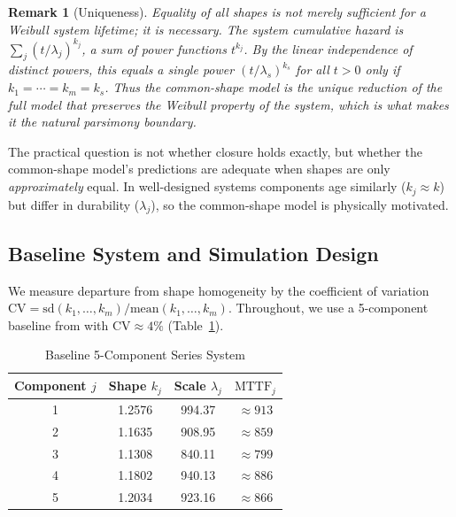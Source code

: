 \documentclass[11pt]{article}
\newcommand{\CV}{\mathrm{CV}}
\newcommand{\MTTF}{\mathrm{MTTF}}
\newtheorem{remark}{Remark}[section]
\begin{document}
\begin{remark}[Uniqueness]
\label{rem:uniqueness}
Equality of all shapes is not merely sufficient for a Weibull system lifetime; it is necessary. The system cumulative hazard is $\sum_j (t/\lambda_j)^{k_j}$, a sum of power functions $t^{k_j}$. By the linear independence of distinct powers, this equals a single power $(t/\lambda_s)^{k_s}$ for all $t>0$ only if $k_1 = \cdots = k_m = k_s$. Thus the common-shape model is the unique reduction of the full model that preserves the Weibull property of the system, which is what makes it the natural parsimony boundary.
\end{remark}

The practical question is not whether closure holds exactly, but whether the common-shape model's predictions are adequate when shapes are only \emph{approximately} equal. In well-designed systems components age similarly ($k_j \approx k$) but differ in durability ($\lambda_j$), so the common-shape model is physically motivated.

\subsection{Baseline System and Simulation Design}
\label{sec:baseline}

We measure departure from shape homogeneity by the coefficient of variation $\CV = \mathrm{sd}(k_1,\ldots,k_m)/\mathrm{mean}(k_1,\ldots,k_m)$. Throughout, we use a 5-component baseline from \citet{Huairu-2013} with $\CV \approx 4\%$ (Table~\ref{tab:series-sys}).

\begin{table}[htbp]
\centering
\caption{Baseline 5-Component Series System}
\label{tab:series-sys}
\begin{tabular}{cccc}
\hline
Component $j$ & Shape $k_j$ & Scale $\lambda_j$ & $\MTTF_j$ \\
\hline
1 & 1.2576 & 994.37 & $\approx 913$ \\
2 & 1.1635 & 908.95 & $\approx 859$ \\
3 & 1.1308 & 840.11 & $\approx 799$ \\
4 & 1.1802 & 940.13 & $\approx 886$ \\
5 & 1.2034 & 923.16 & $\approx 866$ \\
\hline
\end{tabular}
\end{table}
\end{document}
